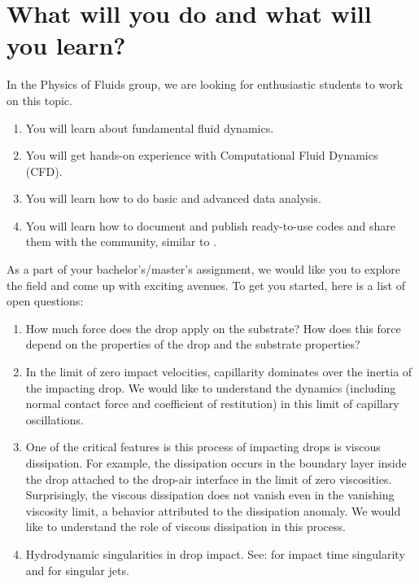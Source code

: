 \documentclass[a4paper,10pt]{article}
\begin{document}
\section*{What will you do and what will you learn?}
In the Physics of Fluids group, we are looking for enthusiastic students to work on this topic.
\begin{enumerate}
\itemsep0em
\item You will learn about fundamental fluid dynamics.
\item You will get hands-on experience with Computational Fluid Dynamics (CFD).
\item You will learn how to do basic and advanced data analysis.
\item You will learn how to document and publish ready-to-use codes and share them with the community, similar to \citet{basiliskVatsal, basiliskVatsalDropFilm, basiliskVatsalViscousBouncing}. 
\end{enumerate}

As a part of your bachelor's/master's assignment, we would like you to explore the field and come up with exciting avenues. To get you started, here is a list of open questions:

\begin{enumerate}
 \item How much force does the drop apply on the substrate? How does this force depend on the properties of the drop and the substrate properties?
 \item In the limit of zero impact velocities, capillarity dominates over the inertia of the impacting drop. We would like to understand the dynamics (including normal contact force and coefficient of restitution) in this limit of capillary oscillations. 
 \item One of the critical features is this process of impacting drops is viscous dissipation. For example, the dissipation occurs in the boundary layer inside the drop attached to the drop-air interface in the limit of zero viscosities. Surprisingly, the viscous dissipation does not vanish even in the vanishing viscosity limit, a behavior attributed to the dissipation anomaly. We would like to understand the role of viscous dissipation in this process. 
 \item Hydrodynamic singularities in drop impact. See: \citet{mandre2012mechanism} for impact time singularity and \citet{Bartolo2006Singular, sanjay_lohse_jalaal_2021, zhang2022impact} for singular jets. 
\end{enumerate} 
\end{document}
